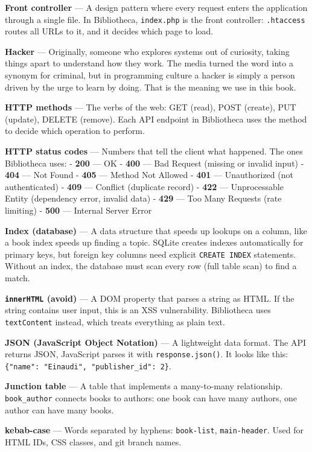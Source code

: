 \documentclass[11pt,a4paper,oneside]{book}
\begin{document}
\textbf{Front controller} --- A design pattern where every
request enters the application through a single file. In
Bibliotheca, \texttt{index.php} is the front controller:
\texttt{.htaccess} routes all URLs to it, and it decides which
page to load.

\textbf{Hacker} --- Originally, someone who explores systems out
of curiosity, taking things apart to understand how they work.
The media turned the word into a synonym for criminal, but in
programming culture a hacker is simply a person driven by the
urge to learn by doing. That is the meaning we use in this book.

\textbf{HTTP methods} --- The verbs of the web: GET (read), POST
(create), PUT (update), DELETE (remove). Each API endpoint in
Bibliotheca uses the method to decide which operation to perform.

\textbf{HTTP status codes} --- Numbers that tell the client what
happened. The ones Bibliotheca uses: - \textbf{200} --- OK -
\textbf{400} --- Bad Request (missing or invalid input) -
\textbf{404} --- Not Found - \textbf{405} --- Method Not Allowed
- \textbf{401} --- Unauthorized (not authenticated) -
\textbf{409} --- Conflict (duplicate record) - \textbf{422} ---
Unprocessable Entity (dependency error, invalid data) -
\textbf{429} --- Too Many Requests (rate limiting) - \textbf{500}
--- Internal Server Error

\textbf{Index (database)} --- A data structure that speeds up
lookups on a column, like a book index speeds up finding a topic.
SQLite creates indexes automatically for primary keys, but
foreign key columns need explicit \texttt{CREATE\ INDEX}
statements. Without an index, the database must scan every row
(full table scan) to find a match.

\textbf{\texttt{innerHTML} (avoid)} --- A DOM property that
parses a string as HTML. If the string contains user input, this
is an XSS vulnerability. Bibliotheca uses \texttt{textContent}
instead, which treats everything as plain text.

\textbf{JSON (JavaScript Object Notation)} --- A lightweight data
format. The API returns JSON, JavaScript parses it with
\texttt{response.json()}. It looks like this:
\texttt{\{"name":\ "Einaudi",\ "publisher\_id":\ 2\}}.

\textbf{Junction table} --- A table that implements a
many-to-many relationship. \texttt{book\_author} connects books
to authors: one book can have many authors, one author can have
many books.

\textbf{kebab-case} --- Words separated by hyphens:
\texttt{book-list}, \texttt{main-header}. Used for HTML IDs, CSS
classes, and git branch names.
\end{document}
